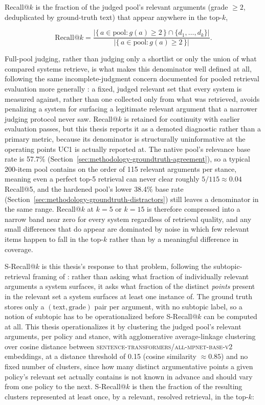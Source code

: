 Recall@$k$ is the fraction of the judged pool's relevant arguments (grade $\geq 2$, deduplicated by
ground-truth text) that appear anywhere in the top-$k$,

\begin{equation}
\mathrm{Recall}@k = \frac{\left| \{\, a \in \text{pool} : g(a) \geq 2 \,\} \cap \{d_1,\dots,d_k\} \right|}
{\left| \{\, a \in \text{pool} : g(a) \geq 2 \,\} \right|}.
\label{eq:evaluation-recall}
\end{equation}

\noindent Full-pool judging, rather than judging only a shortlist or only the union of what
compared systems retrieve, is what makes this denominator well defined at all, following the same
incomplete-judgment concern documented for pooled retrieval evaluation more generally
\cite{buckley2004bpref}: a fixed, judged relevant set that every system is measured against, rather
than one collected only from what was retrieved, avoids penalizing a system for surfacing a
legitimate relevant argument that a narrower judging protocol never saw. Recall@$k$ is retained for
continuity with earlier evaluation passes, but this thesis reports it as a demoted diagnostic
rather than a primary metric, because its denominator is structurally uninformative at the
operating points UC1 is actually reported at. The native pool's relevance base rate is 57.7\%
(Section~\ref{sec:methodology-groundtruth-agreement}), so a typical 200-item pool contains on the
order of 115 relevant arguments per stance, meaning even a perfect top-5 retrieval can never clear
roughly $5/115 \approx 0.04$ Recall@5, and the hardened pool's lower 38.4\% base rate
(Section~\ref{sec:methodology-groundtruth-distractors}) still leaves a denominator in the same
range. Recall@$k$ at $k=5$ or $k=15$ is therefore compressed into a narrow band near zero for every
system regardless of retrieval quality, and any small differences that do appear are dominated by
noise in which few relevant items happen to fall in the top-$k$ rather than by a meaningful
difference in coverage.

S-Recall@$k$ is this thesis's response to that problem, following the subtopic-retrieval framing of
\textcite{zhai2003srecall}: rather than asking what fraction of individually relevant arguments a
system surfaces, it asks what fraction of the distinct \emph{points} present in the relevant set a
system surfaces at least one instance of. The ground truth stores only a $(\text{text}, \text{grade})$
pair per argument, with no subtopic label, so a notion of subtopic has to be operationalized before
S-Recall@$k$ can be computed at all. This thesis operationalizes it by clustering the judged pool's
relevant arguments, per policy and stance, with agglomerative average-linkage clustering over
cosine distance between \textsc{sentence-transformers/all-mpnet-base-v2} embeddings, at a distance
threshold of 0.15 (cosine similarity $\approx 0.85$) and no fixed number of clusters, since how many
distinct argumentative points a given policy's relevant set actually contains is not known in
advance and should vary from one policy to the next. S-Recall@$k$ is then the fraction of the
resulting clusters represented at least once, by a relevant, resolved retrieval, in the top-$k$:

